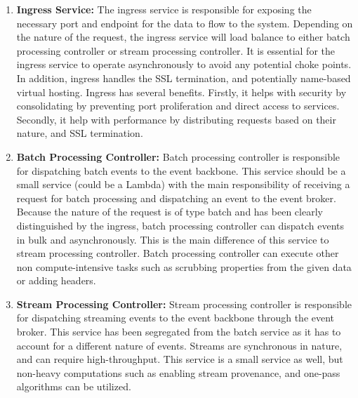 \documentclass[review]{elsarticle}
\begin{document}
\begin{enumerate}
    \item \textbf{Ingress Service:} The ingress service is responsible for exposing the necessary port and endpoint for the data to flow to the system. Depending on the nature of the request, the ingress service will load balance to either batch processing controller or stream processing controller. It is essential for the ingress service to operate asynchronously to avoid any potential choke points. In addition, ingress handles the SSL termination, and potentially name-based virtual hosting. Ingress has several benefits. Firstly, it helps with security by consolidating by preventing port proliferation and direct access to services. Secondly, it help with performance by distributing requests based on their nature, and SSL termination. 
    \item \textbf{Batch Processing Controller:} Batch processing controller is responsible for dispatching batch events to the event backbone. This service should be a small service (could be a Lambda) with the main responsibility of receiving a request for batch processing and dispatching an event to the event broker. Because the nature of the request is of type batch and has been clearly distinguished by the ingress, batch processing controller can dispatch events in bulk and asynchronously. This is the main difference of this service to stream processing controller. Batch processing controller can execute other non compute-intensive tasks such as scrubbing properties from the given data or adding headers.
    \item \textbf{Stream Processing Controller:} Stream processing controller is responsible for dispatching streaming events to the event backbone through the event broker. This service has been segregated from the batch service as it has to account for a different nature of events. Streams are synchronous in nature, and can require high-throughput. This service is a small service as well, but non-heavy computations such as enabling stream provenance, and one-pass algorithms can be utilized. 

\end{enumerate}
\end{document}
